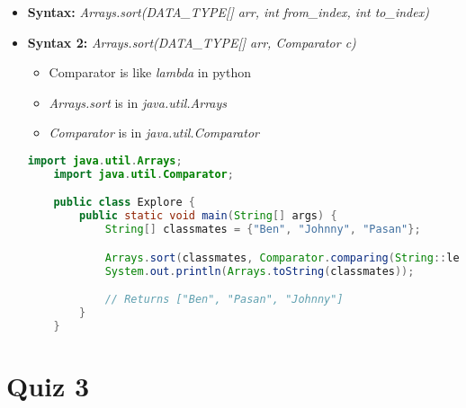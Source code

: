 \documentclass[12pt]{article}
\begin{document}
\bigskip


\begin{itemize}
    \item \textbf{Syntax:} \textit{Arrays.sort(DATA\_TYPE[] arr, int from\_index, int to\_index)}
    \item \textbf{Syntax 2:} \textit{Arrays.sort(DATA\_TYPE[] arr, Comparator c)}
    \begin{itemize}
        \item Comparator is like \textit{lambda} in python
        \item \textit{Arrays.sort} is in \textit{java.util.Arrays}
        \item \textit{Comparator} is in \textit{java.util.Comparator}
    \end{itemize}

    \begin{lstlisting}[language=Java, caption={lesson\_03/Explore.java}]
    import java.util.Arrays;
    import java.util.Comparator;

    public class Explore {
        public static void main(String[] args) {
            String[] classmates = {"Ben", "Johnny", "Pasan"};

            Arrays.sort(classmates, Comparator.comparing(String::length)); // <- sorts based on length of string
            System.out.println(Arrays.toString(classmates));

            // Returns ["Ben", "Pasan", "Johnny"]
        }
    }
    \end{lstlisting}
\end{itemize}

\bigskip

\section{Quiz 3}

\bigskip
\end{document}
